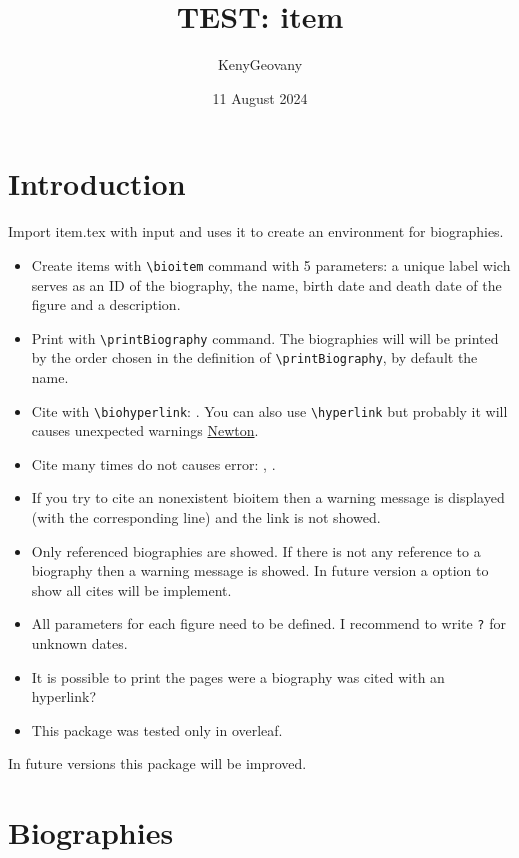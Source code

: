 \documentclass{article}
\title{TEST: item}
\author{KenyGeovany}
\date{11 August 2024}
\begin{document}
\maketitle

\section{Introduction}
Import item.tex with input and uses it to create an environment for biographies. 

\begin{itemize}
    \item Create items with \verb|\bioitem| command with 5 parameters: a unique label wich serves as an ID of the biography, the name, birth date and death date of the figure and a description.
    \item Print with \verb|\printBiography| command. The biographies will will be printed by the order chosen in the definition of \verb|\printBiography|, by default the name.
    \item Cite with \verb|\biohyperlink|: . You can also use \verb|\hyperlink| but probably it will causes unexpected warnings \hyperlink{bioNewton}{Newton}.
    \item Cite many times do not causes error: , .
    \item If you try to cite an nonexistent bioitem then a warning message is displayed (with the corresponding line) and the link is not showed.
    \item Only referenced biographies are showed. If there is not any reference to a biography then a warning message is showed. In future version a option to show all cites will be implement.
    \item All parameters for each figure need to be defined. I recommend to write \verb|?| for unknown dates.
    \item It is possible to print the pages were a biography was cited with an hyperlink?
    \item This package was tested only in overleaf.
\end{itemize}

In future versions this package will be improved.

\section{Biographies}

\printBiography
\end{document}
